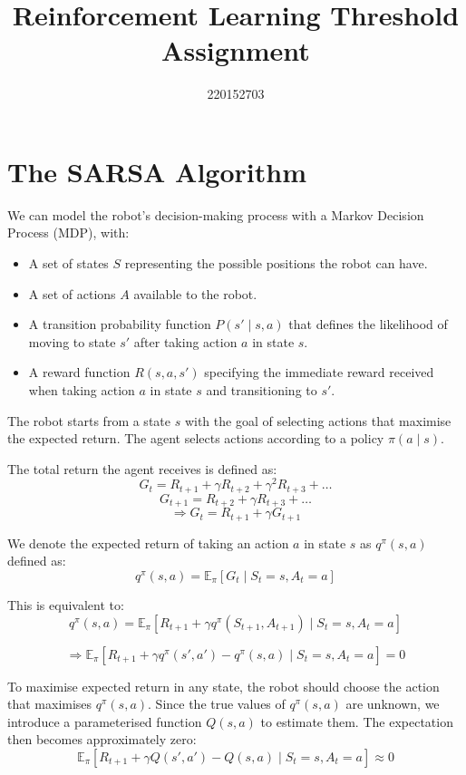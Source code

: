 \documentclass[12pt]{article}
\begin{document}
\title{Reinforcement Learning Threshold Assignment}
\author{220152703}
\date{}
\maketitle

\section{The SARSA Algorithm}
\begin{multicols}{2}

We can model the robot's decision-making process with a Markov Decision Process (MDP), with:

\begin{itemize}
    \item A set of states \( S \) representing the possible positions the robot can have.
    \item A set of actions \( A \) available to the robot.
    \item A transition probability function \( P(s' \mid s,a) \) that defines the likelihood of moving to state \( s' \) after taking action \( a \) in state \( s \).
    \item A reward function \( R(s,a,s') \) specifying the immediate reward received when taking action \( a \) in state \( s \) and transitioning to \( s' \).
\end{itemize}


The robot starts from a state \( s \) with the goal of selecting actions that maximise the expected return. The agent selects actions according to a policy \( \pi(a \mid s) \).

The total return the agent receives is defined as:
\[
G_t = R_{t+1} + \gamma R_{t+2} + \gamma^2 R_{t+3} + \dots
\]
\[
G_{t+1} = R_{t+2} + \gamma R_{t+3} + \dots
\]
\[
\Rightarrow G_t = R_{t+1} + \gamma G_{t+1}
\]

We denote the expected return of taking an action \( a \) in state \( s \) as \( q^\pi(s,a) \) defined as:
\[
q^\pi(s,a) = \mathbb{E}_\pi[G_t \mid S_t = s, A_t = a]
\]

This is equivalent to:
\[
q^\pi(s,a) = \mathbb{E}_\pi[R_{t+1} + \gamma q^\pi(S_{t+1}, A_{t+1}) \mid S_t = s, A_t = a]
\]

\[
\Rightarrow \mathbb{E}_\pi[R_{t+1} + \gamma q^\pi(s', a') - q^\pi(s, a) \mid S_t = s, A_t = a] = 0
\]

To maximise expected return in any state, the robot should choose the action that maximises \( q^\pi(s, a) \). Since the true values of \( q^\pi(s,a) \) are unknown, we introduce a parameterised function \( Q(s,a) \) to estimate them. The expectation then becomes approximately zero:
\[
\mathbb{E}_\pi[R_{t+1} + \gamma Q(s', a') - Q(s, a) \mid S_t = s, A_t = a] \approx 0
\]


\end{multicols}
\end{document}
